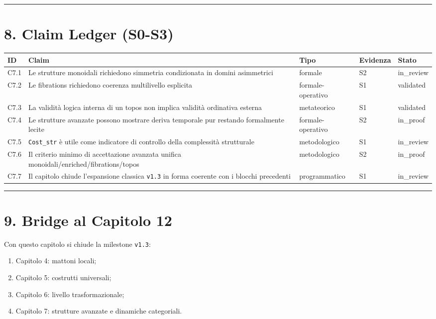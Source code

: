 \begin{center}\rule{0.5\linewidth}{0.5pt}\end{center}

\section{8. Claim Ledger (S0-S3)}

{\def\LTcaptype{none} %
\begin{longtable}[]{@{}lllll@{}}
\toprule\noalign{}
ID & Claim & Tipo & Evidenza & Stato \\
\midrule\noalign{}
\endhead
\bottomrule\noalign{}
\endlastfoot
C7.1 & Le strutture monoidali richiedono simmetria condizionata in domini asimmetrici & formale & S2 & in\_review \\
C7.2 & Le fibrations richiedono coerenza multilivello esplicita & formale-operativo & S1 & validated \\
C7.3 & La validità logica interna di un topos non implica validità ordinativa esterna & metateorico & S1 & validated \\
C7.4 & Le strutture avanzate possono mostrare deriva temporale pur restando formalmente lecite & formale-operativo & S2 & in\_proof \\
C7.5 & \texttt{Cost\_str} è utile come indicatore di controllo della complessità strutturale & metodologico & S1 & in\_review \\
C7.6 & Il criterio minimo di accettazione avanzata unifica monoidali/enriched/fibrations/topos & metodologico & S2 & in\_proof \\
C7.7 & Il capitolo chiude l'espansione classica \texttt{v1.3} in forma coerente con i blocchi precedenti & programmatico & S1 & in\_review \\
\end{longtable}
}

\begin{center}\rule{0.5\linewidth}{0.5pt}\end{center}

\section{9. Bridge al Capitolo 12}

Con questo capitolo si chiude la milestone \texttt{v1.3}:

\begin{enumerate}
\def\labelenumi{\arabic{enumi}.}
\tightlist
\item
  Capitolo 4: mattoni locali;
\item
  Capitolo 5: costrutti universali;
\item
  Capitolo 6: livello trasformazionale;
\item
  Capitolo 7: strutture avanzate e dinamiche categoriali.
\end{enumerate}

